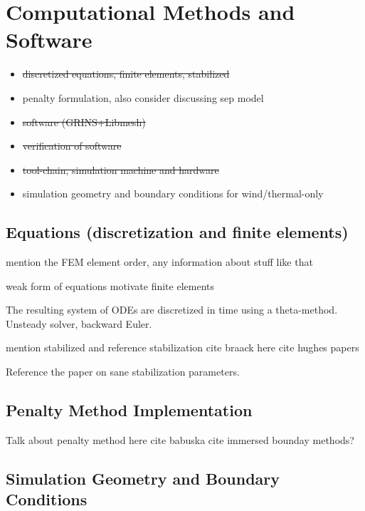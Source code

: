 \section{Computational Methods and Software}
\label{sec:software}

\begin{itemize}
 \item \st{discretized equations, finite elements, stabilized}
 \item penalty formulation, also consider discussing sep model
 \item \st{software (GRINS+Libmesh)}
 \item \st{verification of software}
 \item \st{tool-chain, simulation machine and hardware}
 \item simulation geometry and boundary conditions for wind/thermal-only
\end{itemize}

\subsection{Equations (discretization and finite elements)}

mention the FEM element order, any information about 
stuff like that

weak form of equations
motivate finite elements

The resulting system of ODEs are discretized in time using a theta-method. 
Unsteady solver, backward Euler. 

mention stabilized and reference stabilization
cite braack here
cite hughes papers

Reference the paper on sane stabilization parameters. 

\subsection{Penalty Method Implementation}

Talk about penalty method here
cite babuska
cite immersed bounday methods?



\subsection{Simulation Geometry and Boundary Conditions}

%
%


